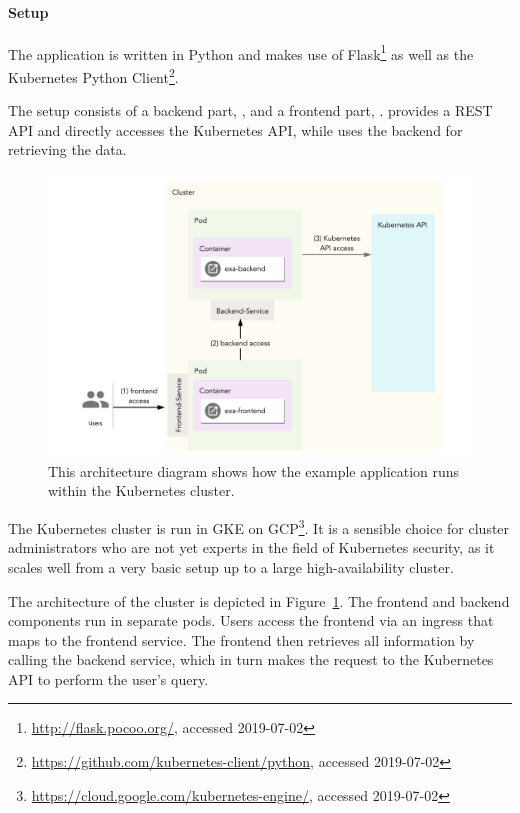 \paragraph{Setup}

The application is written in Python and makes use of Flask\footnote{\url{http://flask.pocoo.org/}, accessed 2019-07-02} as well as the Kubernetes Python Client\footnote{\url{https://github.com/kubernetes-client/python}, accessed 2019-07-02}. 

The setup consists of a backend part, , and a frontend part, .  provides a REST API and directly accesses the Kubernetes API, while  uses the backend for retrieving the data. 

\begin{figure}[H]
\begin{center}
    \includegraphics[width=1.0\linewidth]{figures/exa_architecture.pdf}
    \caption[Architecture of the example application]{This architecture diagram shows how the example application runs within the Kubernetes cluster.}
    \label{fig:exaArchitecture}
\end{center}
\end{figure}

The Kubernetes cluster is run in \ac{GKE} on \ac{GCP}\footnote{\url{https://cloud.google.com/kubernetes-engine/}, accessed 2019-07-02}. It is a sensible choice for cluster administrators who are not yet experts in the field of Kubernetes security, as it scales well from a very basic setup up to a large high-availability cluster.

The architecture of the cluster is depicted in Figure~\ref{fig:exaArchitecture}. The frontend and backend components run in separate pods. Users access the frontend via an ingress that maps to the frontend service. The frontend then retrieves all information by calling the backend service, which in turn makes the request to the Kubernetes API to perform the user's query.

